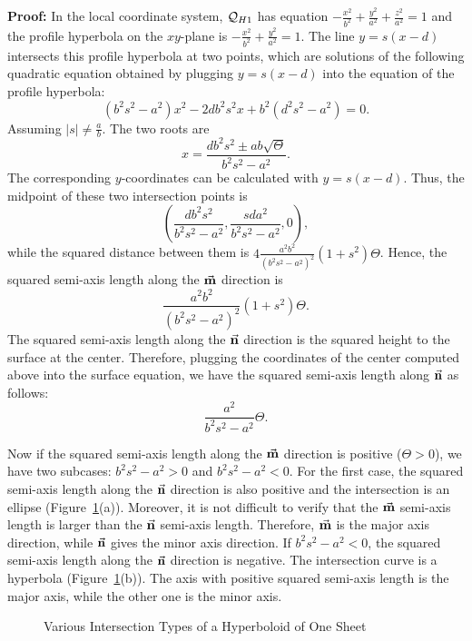 {\bf Proof:}  In the local coordinate system, ${\cal Q}_{H1}$ has equation
$-\frac{x^2}{b^2}+\frac{y^2}{a^2}+\frac{z^2}{a^2}=1$ and the profile hyperbola
on the $xy$-plane is $-\frac{x^2}{b^2}+\frac{y^2}{a^2}=1$.  
The line $y=s(x-d)$ intersects this
profile hyperbola at two points, which are solutions of the following
quadratic equation obtained by plugging $y=s(x-d)$ into
the equation of the profile hyperbola:
\begin{equation}
\label{eqn:hy1-2degree}
     (b^2s^2-a^2)x^2-2db^2s^2x+b^2(d^2s^2-a^2)=0.
\end{equation}
Assuming $|s|\neq\frac{a}{b}$.  The two roots are
\begin{equation}
\label{eqn:hy1-roots}
     x = \frac{db^2s^2\pm ab\sqrt{\Theta}}{b^2s^2-a^2}.
\end{equation}
The corresponding $y$-coordinates can be calculated with $y=s(x-d)$.  Thus,
the midpoint of these two intersection points is 
\[ \left(\frac{db^2s^2}{b^2s^2-a^2},\frac{sda^2}{b^2s^2-a^2},0\right), \]
while the squared distance between them is
$4\frac{a^2b^2}{(b^2s^2-a^2)^2}(1+s^2)\Theta$.  Hence, the squared semi-axis 
length along the $\vec{\bf m}$ direction is
\begin{equation}
\label{eqn:hy1-m-length}
     \frac{a^2b^2}{(b^2s^2-a^2)^2}(1+s^2)\Theta.
\end{equation}
The squared semi-axis length along the $\vec{\bf n}$ direction is the squared 
height to the surface at the center.  Therefore, plugging the coordinates of 
the center computed above into the surface equation, we have the squared
semi-axis length along $\vec{\bf n}$ as follows:
\begin{equation}
\label{eqn:hy1-n-length}
     \frac{a^2}{b^2s^2-a^2}\Theta. 
\end{equation}

     Now if the squared semi-axis length along the $\vec{\bf m}$ direction is 
positive ($\Theta>0$), we have two subcases:  $b^2s^2-a^2>0$ and
$b^2s^2-a^2<0$.  For the first case, the squared semi-axis length along the 
$\vec{\bf n}$ direction is also positive and the intersection is an 
ellipse (Figure~\ref{fig:hy1-intersections}(a)).  Moreover, it is not difficult
to verify that the $\vec{\bf m}$ semi-axis length is larger than the $\vec{\bf n}$ 
semi-axis length.  Therefore, $\vec{\bf m}$ is the major axis direction, while 
$\vec{\bf n}$ gives the minor axis direction.
If $b^2s^2-a^2<0$, the squared semi-axis length
along the $\vec{\bf n}$ direction is negative.  
The intersection curve is a hyperbola
(Figure~\ref{fig:hy1-intersections}(b)).  
The axis with positive squared semi-axis length is the major axis,
while the other one is the minor axis.
\begin{figure}
\vspace{9.5cm}
\caption{Various Intersection Types of a Hyperboloid of One Sheet}
\label{fig:hy1-intersections}
\end{figure}

